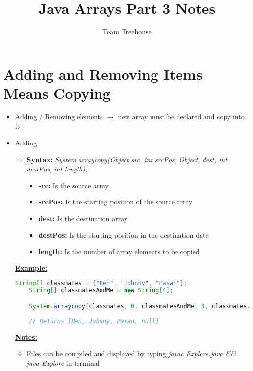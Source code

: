 \documentclass[12pt]{article}
\begin{document}
\title{Java Arrays Part 3 Notes}
\author{Team Treehouse}
\maketitle

\section{Adding and Removing Items Means Copying}

\bigskip

\begin{itemize}
    \item Adding / Removing elements $\to$ new array must be declared and copy into it
    \item Adding
    \begin{itemize}
        \item \textbf{Syntax:} \textit{System.arraycopy(Object src, int srcPos, Object, dest, int destPos, int length);}
        \begin{itemize}
            \item \textbf{src:} Is the source array
            \item \textbf{srcPos:} Is the starting position of the source array
            \item \textbf{dest:} Is the destination array
            \item \textbf{destPos:} Is the starting position in the destination data
            \item \textbf{length:} Is the number of array elements to be copied
        \end{itemize}
    \end{itemize}

    \bigskip

    \underline{\textbf{Example:}}

    \bigskip

    \begin{lstlisting}[language=Java, caption={lesson\_01/Explore.java}]
    String[] classmates = {"Ben", "Johnny", "Pasan"};
    String[] classmatesAndMe = new String[4];

    System.arraycopy(classmates, 0, classmatesAndMe, 0, classmates.length);

    // Returns [Ben, Johnny, Pasan, null]
    \end{lstlisting}

    \underline{\textbf{Notes:}}

    \bigskip

    \begin{itemize}
        \item Files can be compiled and displayed by typing \textit{javac Explore.java \&\& java Explore}
        in terminal
    \end{itemize}
\end{itemize}
\end{document}
